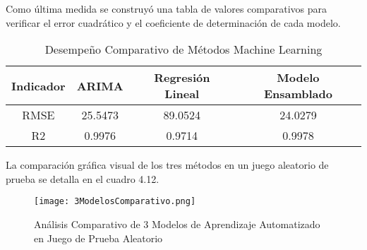 Como última medida se construyó una tabla de valores comparativos para verificar el error cuadrático y el coeficiente de determinación de cada modelo.

\begin{table}[h!]
  \begin{center}
    \caption{Desempeño Comparativo de Métodos Machine Learning}
    \label{tab:comparativoMLmetodos}
    \begin{tabular}{c|c|c|c}
      \textbf{Indicador} & \textbf{ARIMA} & \textbf{Regresión Lineal} & \textbf{Modelo Ensamblado}\\
      \hline
      RMSE & 25.5473 &89.0524 & 24.0279 \\
      R2 & 0.9976 & 0.9714 & 0.9978 \\
    \end{tabular}
  \end{center}
\end{table}

La comparación gráfica visual de los tres métodos en un juego aleatorio de prueba se detalla en el cuadro 4.12.

\begin{figure}[h!]
    \centering
    \texttt{[image: 3ModelosComparativo.png]}
    \caption{Análisis Comparativo de 3 Modelos de Aprendizaje Automatizado en Juego de Prueba Aleatorio}
\end{figure}
